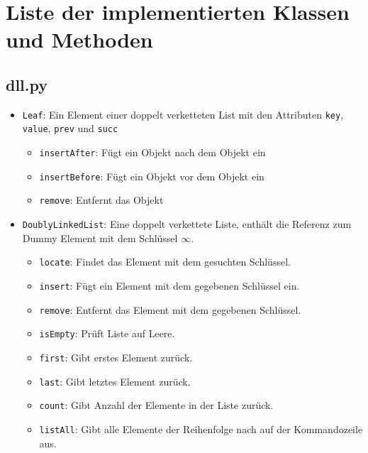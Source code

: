 
\chapter{Liste der implementierten Klassen und Methoden}
\label{appendix:classes}
\section{dll.py}

\begin{itemize}

    \item \texttt{Leaf}: Ein Element einer doppelt verketteten List mit den Attributen \texttt{key}, \texttt{value}, \texttt{prev} und \texttt{succ}

    \begin{itemize}
        \item \texttt{insertAfter}: Fügt ein Objekt nach dem Objekt ein
        \item \texttt{insertBefore}: Fügt ein Objekt vor dem Objekt ein
        \item \texttt{remove}: Entfernt das Objekt
    \end{itemize}

    \item \texttt{DoublyLinkedList}: Eine doppelt verkettete Liste, enthält die Referenz zum Dummy Element mit dem Schlüssel $\infty$.

    \begin{itemize}
        \item \texttt{locate}: Findet das Element mit dem gesuchten Schlüssel.
        \item \texttt{insert}: Fügt ein Element mit dem gegebenen Schlüssel ein.
        \item \texttt{remove}: Entfernt das Element mit dem gegebenen Schlüssel.
        \item \texttt{isEmpty}: Prüft Liste auf Leere.
        \item \texttt{first}: Gibt erstes Element zurück.
        \item \texttt{last}: Gibt letztes Element zurück.
        \item \texttt{count}: Gibt Anzahl der Elemente in der Liste zurück.
        \item \texttt{listAll}: Gibt alle Elemente der Reihenfolge nach auf der Kommandozeile aus.
    \end{itemize}

\end{itemize}

